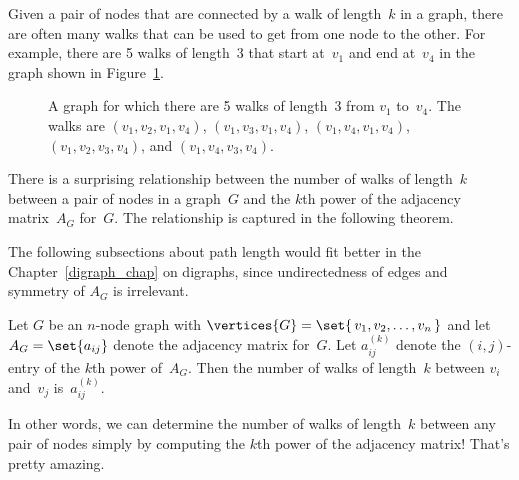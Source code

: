 Given a pair of nodes that are connected by a walk of length~$k$ in a
graph, there are often many walks that can be used to get from one
node to the other.  For example, there are 5 walks of length~3 that
start at~$v_1$ and end at~$v_4$ in the graph shown in
Figure~\ref{fig:5AD}.

\begin{figure}


\caption{A graph for which there are 5 walks of length~3 from $v_1$
  to~$v_4$.  The walks are $(v_1, v_2, v_1, v_4)$, $(v_1, v_3, v_1,
  v_4)$, $(v_1, v_4, v_1, v_4)$, $(v_1, v_2, v_3, v_4)$, and $(v_1,
  v_4, v_3, v_4)$.}
\label{fig:5AD}
\end{figure}

There is a surprising relationship between the number of walks of
length~$k$ between a pair of nodes in a graph~$G$ and the $k$th power
of the adjacency matrix~$A_G$ for~$G$.  The relationship is captured
in the following theorem.
\begin{editingnotes}
   The following subsections about path length would
  fit better in the Chapter~\ref{digraph_chap} on digraphs, since
  undirectedness of edges and symmetry of $A_G$ is irrelevant.
\end{editingnotes}

\begin{theorem}\label{thm:5AE}
Let $G$ be an $n$-node graph with $\vertices{G} = \set{\, v_1, v_2, \dots,
v_n\, }$ and let $A_G = \set{ a_{ij} }$ denote the adjacency matrix
for~$G$.  Let $a_{ij}^{(k)}$ denote the $(i, j)$-entry of the $k$th
power of~$A_G$.  Then the number of walks of length~$k$ between $v_i$
and~$v_j$ is~$a_{ij}^{(k)}$.
\end{theorem}

In other words, we can determine the number of walks of length~$k$
between any pair of nodes simply by computing the $k$th power of the
adjacency matrix!  That's pretty amazing.

